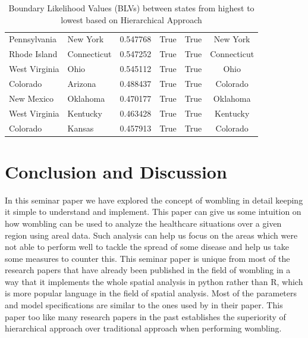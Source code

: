 \documentclass[enabledeprecatedfontcommands,parskip=half,twoside=semi,BCOR=0mm]{scrreprt}
\numberwithin{equation}{chapter}
\theoremstyle{definition}
\theoremstyle{remark}
\begin{document}
\begin{table}[h!]
\begin{adjustbox}{max width=\textwidth}
\begin{tabular}{|l|l|c|c|c|c|}
        Pennsylvania & New York & 0.547768 & True & True & New York \\
        Rhode Island & Connecticut & 0.547252 & True & True & Connecticut \\
        West Virginia & Ohio & 0.545112 & True & True & Ohio \\
        Colorado & Arizona & 0.488437 & True & True & Colorado \\
        New Mexico & Oklahoma & 0.470177 & True & True & Oklahoma \\
        West Virginia & Kentucky & 0.463428 & True & True & Kentucky \\
        Colorado & Kansas & 0.457913 & True & True & Colorado \\
        \hline
    \end{tabular}
    \end{adjustbox}
    \caption{Boundary Likelihood Values (BLVs) between states from highest to lowest based on Hierarchical Approach}
    \label{tab:boundary_diff}
    \end{table}

    \chapter{Conclusion and Discussion}
    In this seminar paper we have explored the concept of wombling in detail keeping it simple to understand and implement. This paper can give us some intuition on how wombling can be used to analyze the healthcare situations over a given region using areal data. Such analysis can help us focus on the areas which were not able to perform well to tackle the spread of some disease and help us take some measures to counter this. This seminar paper is unique from most of the research papers that have already been published in the field of wombling in a way that it implements the whole spatial analysis in python rather than R, which is more popular language in the field of spatial analysis. Most of the parameters and model specifications are similar to the ones used by \cite{Lu_Carlin.2005} in their paper. This paper too like many research papers in the past establishes the superiority of hierarchical approach over traditional approach when performing wombling.
    
\end{document}
